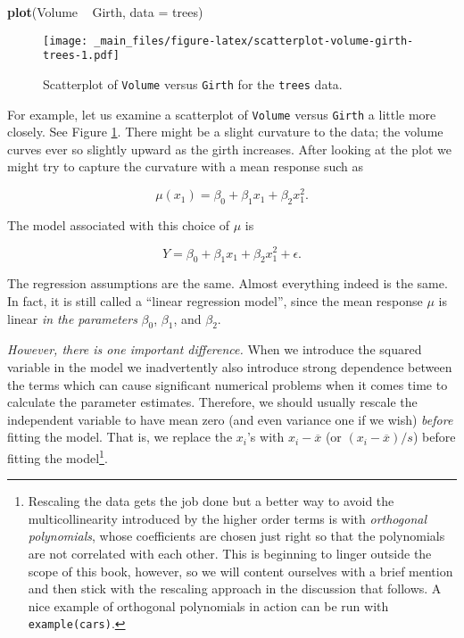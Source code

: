 \documentclass[]{book}
\newenvironment{Shaded}{\begin{snugshade}}{\end{snugshade}}
\newcommand{\KeywordTok}[1]{\textcolor[rgb]{0.13,0.29,0.53}{\textbf{{#1}}}}
\newcommand{\DataTypeTok}[1]{\textcolor[rgb]{0.13,0.29,0.53}{{#1}}}
\newcommand{\StringTok}[1]{\textcolor[rgb]{0.31,0.60,0.02}{{#1}}}
\newcommand{\NormalTok}[1]{{#1}}
\let\rmarkdownfootnote\footnote%
\def\footnote{\protect\rmarkdownfootnote}
\numberwithin{equation}{chapter}
\numberwithin{figure}{chapter}
\theoremstyle{plain}
\theoremstyle{definition}
\theoremstyle{remark}
\theoremstyle{definition}
\theoremstyle{definition}
\theoremstyle{remark}
\begin{document}
\begin{Shaded}
\begin{Highlighting}[]
\KeywordTok{plot}\NormalTok{(Volume ~}\StringTok{ }\NormalTok{Girth, }\DataTypeTok{data =} \NormalTok{trees)}
\end{Highlighting}
\end{Shaded}

\begin{figure}[htbp]
\centering
\texttt{[image: \_main\_files/figure-latex/scatterplot-volume-girth-trees-1.pdf]}
\caption{\label{fig:scatterplot-volume-girth-trees}\small Scatterplot of
\texttt{Volume} versus \texttt{Girth} for the \texttt{trees} data.}
\end{figure}




For example, let us examine a scatterplot of \texttt{Volume} versus
\texttt{Girth} a little more closely. See Figure
\ref{fig:scatterplot-volume-girth-trees}. There might be a slight
curvature to the data; the volume curves ever so slightly upward as the
girth increases. After looking at the plot we might try to capture the
curvature with a mean response such as

\begin{equation}
\mu(x_{1})=\beta_{0}+\beta_{1}x_{1}+\beta_{2}x_{1}^{2}.
\end{equation}

The model associated with this choice of \(\mu\) is

\begin{equation}
Y=\beta_{0}+\beta_{1}x_{1}+\beta_{2}x_{1}^{2}+\epsilon.
\end{equation}

The regression assumptions are the same. Almost everything indeed is the
same. In fact, it is still called a ``linear regression model'', since
the mean response \(\mu\) is linear \emph{in the parameters}
\(\beta_{0}\), \(\beta_{1}\), and \(\beta_{2}\).

\emph{However, there is one important difference.} When we introduce the
squared variable in the model we inadvertently also introduce strong
dependence between the terms which can cause significant numerical
problems when it comes time to calculate the parameter estimates.
Therefore, we should usually rescale the independent variable to have
mean zero (and even variance one if we wish) \emph{before} fitting the
model. That is, we replace the \(x_{i}\)'s with \(x_{i}-\overline{x}\)
(or \((x_{i}-\overline{x})/s\)) before fitting the model\footnote{Rescaling
  the data gets the job done but a better way to avoid the
  multicollinearity introduced by the higher order terms is with
  \emph{orthogonal polynomials}, whose coefficients are chosen just
  right so that the polynomials are not correlated with each other. This
  is beginning to linger outside the scope of this book, however, so we
  will content ourselves with a brief mention and then stick with the
  rescaling approach in the discussion that follows. A nice example of
  orthogonal polynomials in action can be run with
  \texttt{example(cars)}.}.
\end{document}
